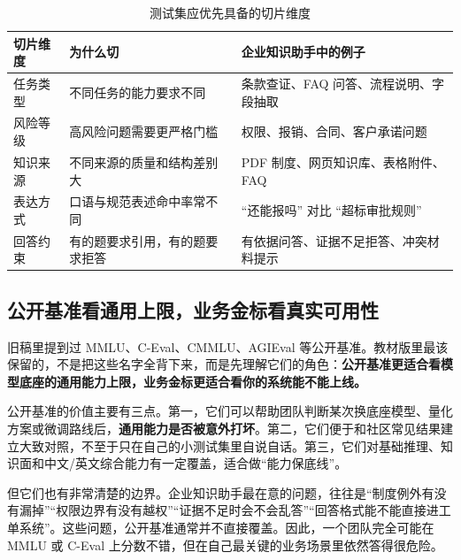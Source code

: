 \begin{table}[H]
\centering
\small
\begin{tabularx}{\textwidth}{>{\raggedright\arraybackslash}p{2.8cm}>{\raggedright\arraybackslash}p{3cm}>{\raggedright\arraybackslash}X}
\toprule
\textbf{切片维度} & \textbf{为什么切} & \textbf{企业知识助手中的例子} \\
\midrule
任务类型 & 不同任务的能力要求不同 & 条款查证、FAQ 问答、流程说明、字段抽取 \\
风险等级 & 高风险问题需要更严格门槛 & 权限、报销、合同、客户承诺问题 \\
知识来源 & 不同来源的质量和结构差别大 & PDF 制度、网页知识库、表格附件、FAQ \\
表达方式 & 口语与规范表述命中率常不同 & “还能报吗” 对比 “超标审批规则” \\
回答约束 & 有的题要求引用，有的题要求拒答 & 有依据问答、证据不足拒答、冲突材料提示 \\
\bottomrule
\end{tabularx}
\caption{测试集应优先具备的切片维度}
\label{tab:eval-slices}
\end{table}

\subsection{公开基准看通用上限，业务金标看真实可用性}
旧稿里提到过 MMLU、C-Eval、CMMLU、AGIEval 等公开基准。教材版里最该保留的，不是把这些名字全背下来，而是先理解它们的角色：\textbf{公开基准更适合看模型底座的通用能力上限，业务金标更适合看你的系统能不能上线。}

公开基准的价值主要有三点。第一，它们可以帮助团队判断某次换底座模型、量化方案或微调路线后，\textbf{通用能力是否被意外打坏}。第二，它们便于和社区常见结果建立大致对照，不至于只在自己的小测试集里自说自话。第三，它们对基础推理、知识面和中文/英文综合能力有一定覆盖，适合做“能力保底线”。

但它们也有非常清楚的边界。企业知识助手最在意的问题，往往是“制度例外有没有漏掉”“权限边界有没有越权”“证据不足时会不会乱答”“回答格式能不能直接进工单系统”。这些问题，公开基准通常并不直接覆盖。因此，一个团队完全可能在 MMLU 或 C-Eval 上分数不错，但在自己最关键的业务场景里依然答得很危险。

